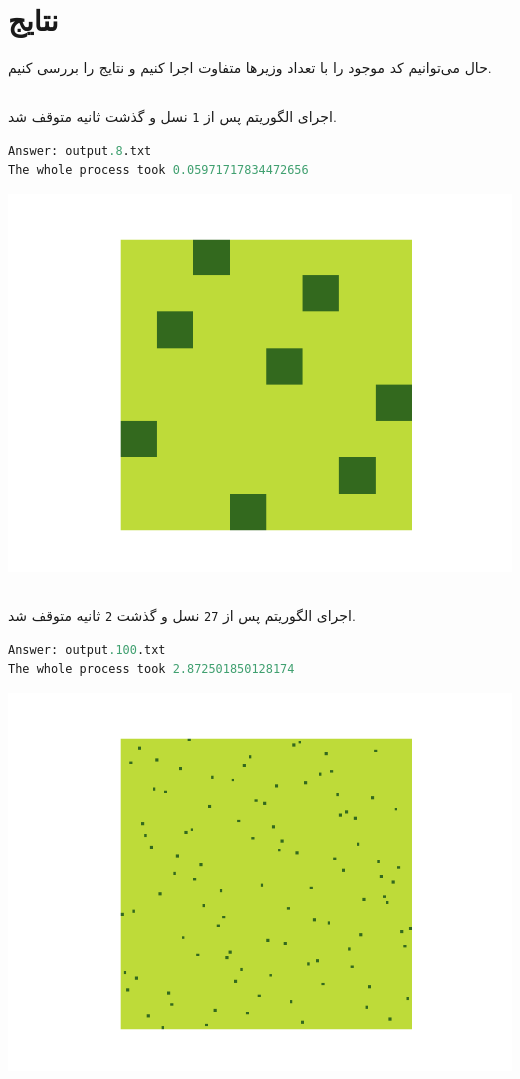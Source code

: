 \documentclass[a4paper, 12pt]{article}
\theoremstyle{definition}
\begin{document}
\section{نتایج}

حال می‌توانیم کد موجود را با تعداد وزیرها متفاوت اجرا کنیم و نتایج را بررسی کنیم.

\subsection{}

اجرای الگوریتم پس از
\texttt{1}
نسل و گذشت
ثانیه متوقف شد.

\LTR
\begin{lstlisting}[language=Python]
Answer: output.8.txt
The whole process took 0.05971717834472656
\end{lstlisting}
\RTL

\begin{center}
    \includegraphics[width=.7\textwidth]{output.8.png}
\end{center}

\subsection{}

اجرای الگوریتم پس از
\texttt{27}
نسل و گذشت
\texttt{2}
ثانیه متوقف شد.

\LTR
\begin{lstlisting}[language=Python]
Answer: output.100.txt
The whole process took 2.872501850128174
\end{lstlisting}
\RTL

\begin{center}
    \includegraphics[width=.7\textwidth]{output.100.png}
\end{center}
\end{document}
